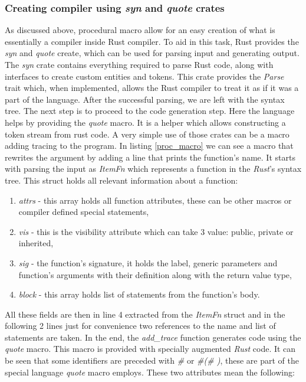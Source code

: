 \subsubsection{Creating compiler using \textit{syn} and \textit{quote} crates}
As discussed above, procedural macro allow for an easy creation of what is essentially a compiler inside Rust compiler. To aid in this task, Rust provides the \textit{syn} and \textit{quote} create, which can be used for parsing input and generating output. The \textit{syn} crate contains everything required to parse Rust code, along with interfaces to create custom entities and tokens. This crate provides the \textit{Parse} trait which, when implemented, allows the Rust compiler to treat it as if it was a part of the language. After the successful parsing, we are left with the syntax tree. The next step is to proceed to the code generation step. Here the language helps by providing the \textit{quote} macro. It is a helper which allows constructing a token stream from rust code. A very simple use of those crates can be a macro adding tracing to the program. In listing \ref{proc_macro} we can see a macro that rewrites the argument by adding a line that prints the function's name. It starts with parsing the input as \textit{ItemFn} which represents a function in the \textit{Rust}'s syntax tree. This struct holds all relevant information about a function:
\begin{enumerate}
    \item \textit{attrs} - this array holds all function attributes, these can be other macros or compiler defined special statements,
    \item \textit{vis} - this is the visibility attribute which can take 3 value: public, private or inherited,
    \item \textit{sig} - the function's signature, it holds the label, generic parameters and function's arguments with their definition along with the return value type,
    \item \textit{block} - this array holds list of statements from the function's body.
\end{enumerate}
All these fields are then in line 4 extracted from the \textit{ItemFn} struct and in the following 2 lines just for convenience two references to the name and list of statements are taken. In the end, the \textit{add\_trace} function generates code using the \textit{quote} macro. This macro is provided with specially augmented \textit{Rust} code. It can be seen that some identifiers are preceded with \textit{\#} or \textit{\#(\# )\*}, these are part of the special language \textit{quote} macro employs. These two attributes mean the following:
